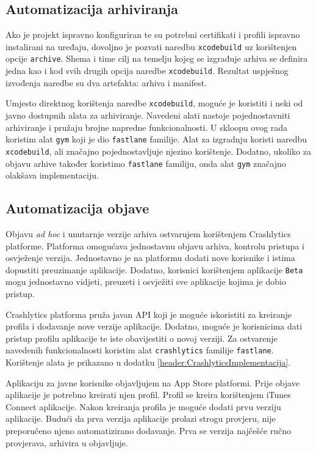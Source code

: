 \documentclass[times, utf8, diplomski, numeric]{fer}
\begin{document}
\subsection{Automatizacija arhiviranja}

Ako je projekt ispravno konfiguriran te su potrebni certifikati i profili ispravno instalirani na uređaju, dovoljno je pozvati naredbu \verb|xcodebuild| uz korištenjen opcije \verb|archive|. Shema i time cilj na temelju kojeg se izgrađuje arhiva se definira jedna kao i kod svih drugih opcija naredbe \verb|xcodebuild|. Rezultat uspješnog izvođenja naredbe su dva artefakta: arhiva i manifest.

Umjesto direktnog korištenja naredbe \verb|xcodebuild|, moguće je koristiti i neki od javno dostupnih alata za arhiviranje. Navedeni alati nastoje pojednostavniti arhiviranje i pružaju brojne napredne funkcionalnosti. U skloopu ovog rada koristim alat \verb|gym| koji je dio \verb|fastlane| familije. Alat za izgradnju koristi naredbu \verb|xcodebuild|, ali značajno pojednostavljuje njezino korištenje. Dodatno, ukoliko za objavu arhive također koristimo \verb|fastlane| familiju, onda alat \verb|gym| značajno olakšava implementaciju.


\subsection{Automatizacija objave}

Objavu \textit{ad hoc} i unutarnje verzije arhiva ostvarujem korištenjem Crashlytics platforme. Platforma omogućava jednostavnu objavu arhiva, kontrolu pristupa i osvježenje verzija. Jednostavno je na platformu dodati nove korisnike i istima dopustiti preuzimanje aplikacije. Dodatno, korisnici korištenjem aplikacije \verb|Beta| mogu jednostavno vidjeti, preuzeti i osvježiti sve aplikacije kojima je dobio pristup.

Crashlytics platforma pruža javan API koji je moguće iskoristiti za kreiranje profila i dodavanje nove verzije aplikacije. Dodatno, moguće je korisnicima dati pristup profilu aplikacije te iste obavijestiti o novoj verziji. Za ostvarenje navedenih funkcionalnosti koristim alat \verb|crashlytics| familije \verb|fastlane|. Korištenje alata je prikazano u dodatku \ref{header:CrashlyticsImplementacija}.

Aplikaciju za javne korisnike objavljujem na App Store platformi. Prije objave aplikacije je potrebno kreirati njen profil. Profil se kreira korištenjem iTunes Connect aplikacije. Nakon kreiranja profila je moguće dodati prvu verziju aplikacije. Budući da prva verzija aplikacije prolazi strogu provjeru, nije preporučeno njeno automatizirano dodavanje. Prva se verzija najčešće ručno provjerava, arhivira u objavljuje.
\end{document}
